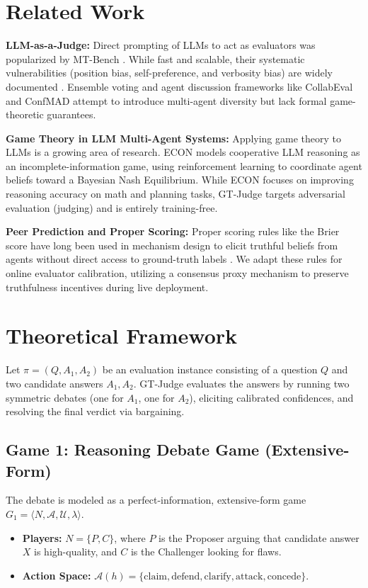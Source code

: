 \documentclass[11pt,a4paper]{article}
\begin{document}
\section{Related Work}
\textbf{LLM-as-a-Judge:} Direct prompting of LLMs to act as evaluators was popularized by MT-Bench \citep{mtbench2023}. While fast and scalable, their systematic vulnerabilities (position bias, self-preference, and verbosity bias) are widely documented \citep{trustjudge2026}. Ensemble voting and agent discussion frameworks like CollabEval \citep{collabeval2025} and ConfMAD \citep{confmad2025} attempt to introduce multi-agent diversity but lack formal game-theoretic guarantees.

\textbf{Game Theory in LLM Multi-Agent Systems:} Applying game theory to LLMs is a growing area of research. ECON \citep{econ2025} models cooperative LLM reasoning as an incomplete-information game, using reinforcement learning to coordinate agent beliefs toward a Bayesian Nash Equilibrium. While ECON focuses on improving reasoning accuracy on math and planning tasks, GT-Judge targets adversarial evaluation (judging) and is entirely training-free.

\textbf{Peer Prediction and Proper Scoring:} Proper scoring rules like the Brier score have long been used in mechanism design to elicit truthful beliefs from agents without direct access to ground-truth labels \citep{peer2026, prelec2004}. We adapt these rules for online evaluator calibration, utilizing a consensus proxy mechanism to preserve truthfulness incentives during live deployment.

\section{Theoretical Framework}
Let $\pi = (Q, A_1, A_2)$ be an evaluation instance consisting of a question $Q$ and two candidate answers $A_1, A_2$. GT-Judge evaluates the answers by running two symmetric debates (one for $A_1$, one for $A_2$), eliciting calibrated confidences, and resolving the final verdict via bargaining.

\subsection{Game 1: Reasoning Debate Game (Extensive-Form)}
The debate is modeled as a perfect-information, extensive-form game $G_1 = \langle N, \mathcal{A}, \mathcal{U}, \lambda \rangle$.
\begin{itemize}
    \item \textbf{Players:} $N = \{P, C\}$, where $P$ is the Proposer arguing that candidate answer $X$ is high-quality, and $C$ is the Challenger looking for flaws.
    \item \textbf{Action Space:} $\mathcal{A}(h) = \{\text{claim}, \text{defend}, \text{clarify}, \text{attack}, \text{concede}\}$.
\end{itemize}
\end{document}
